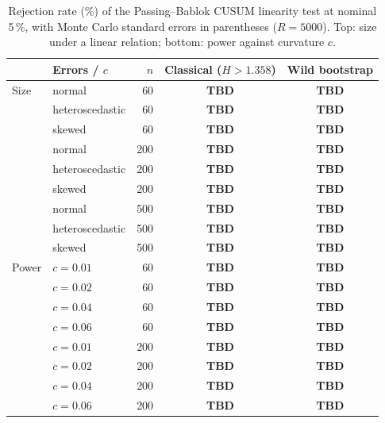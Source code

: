 \begin{table}[htbp]
\centering
\caption{Rejection rate (\%) of the Passing--Bablok CUSUM linearity test at nominal 5\,\%, with Monte Carlo standard errors in parentheses ($R = 5000$). Top: size under a linear relation; bottom: power against curvature $c$.}
\label{tab:supp:sim:pb_cusum_calibration}
\begin{tabular}{llrcc}
\hline
 & Errors / $c$ & $n$ & Classical ($H > 1.358$) & Wild bootstrap \\
\hline
Size & normal          & 60  & \textbf{TBD} & \textbf{TBD} \\
     & heteroscedastic & 60  & \textbf{TBD} & \textbf{TBD} \\
     & skewed          & 60  & \textbf{TBD} & \textbf{TBD} \\
     & normal          & 200 & \textbf{TBD} & \textbf{TBD} \\
     & heteroscedastic & 200 & \textbf{TBD} & \textbf{TBD} \\
     & skewed          & 200 & \textbf{TBD} & \textbf{TBD} \\
     & normal          & 500 & \textbf{TBD} & \textbf{TBD} \\
     & heteroscedastic & 500 & \textbf{TBD} & \textbf{TBD} \\
     & skewed          & 500 & \textbf{TBD} & \textbf{TBD} \\
\hline
Power & $c = 0.01$ & 60  & \textbf{TBD} & \textbf{TBD} \\
      & $c = 0.02$ & 60  & \textbf{TBD} & \textbf{TBD} \\
      & $c = 0.04$ & 60  & \textbf{TBD} & \textbf{TBD} \\
      & $c = 0.06$ & 60  & \textbf{TBD} & \textbf{TBD} \\
      & $c = 0.01$ & 200 & \textbf{TBD} & \textbf{TBD} \\
      & $c = 0.02$ & 200 & \textbf{TBD} & \textbf{TBD} \\
      & $c = 0.04$ & 200 & \textbf{TBD} & \textbf{TBD} \\
      & $c = 0.06$ & 200 & \textbf{TBD} & \textbf{TBD} \\
\hline
\end{tabular}
\end{table}

